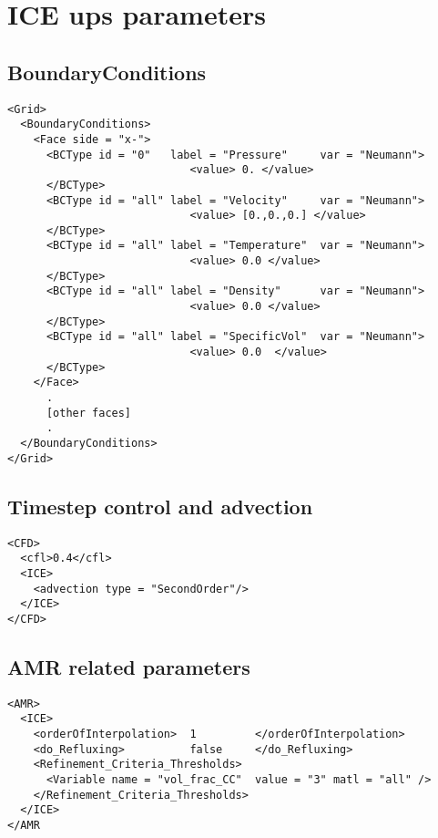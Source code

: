 \documentclass[fleqn,10pt]{article}
\begin{document}
\setcounter{equation}{0}
\setcounter{figure}{0}
\setcounter{section}{0}


\section{ICE ups parameters}
\subsection{BoundaryConditions}
\small
\begin{verbatim}
<Grid>
  <BoundaryConditions>
    <Face side = "x-">
      <BCType id = "0"   label = "Pressure"     var = "Neumann">
                            <value> 0. </value>
      </BCType>
      <BCType id = "all" label = "Velocity"     var = "Neumann">
                            <value> [0.,0.,0.] </value>
      </BCType>
      <BCType id = "all" label = "Temperature"  var = "Neumann">
                            <value> 0.0 </value>
      </BCType>
      <BCType id = "all" label = "Density"      var = "Neumann">
                            <value> 0.0 </value>
      </BCType>
      <BCType id = "all" label = "SpecificVol"  var = "Neumann">
                            <value> 0.0  </value>
      </BCType>
    </Face>
      .
      [other faces]
      .
  </BoundaryConditions>
</Grid>
\end{verbatim}
\normalfont
\subsection{Timestep control and advection}
\small
\begin{verbatim}
<CFD>
  <cfl>0.4</cfl>
  <ICE>
    <advection type = "SecondOrder"/>        
  </ICE>      
</CFD>
\end{verbatim}
\normalfont

\subsection{AMR related parameters}
\small
\begin{verbatim}
<AMR>
  <ICE>
    <orderOfInterpolation>  1         </orderOfInterpolation>
    <do_Refluxing>          false     </do_Refluxing>
    <Refinement_Criteria_Thresholds>
      <Variable name = "vol_frac_CC"  value = "3" matl = "all" />
    </Refinement_Criteria_Thresholds>
  </ICE>
</AMR
\end{verbatim}
\normalfont
\end{document}
